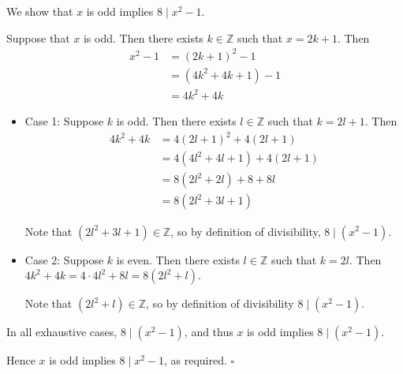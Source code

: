 We show that $x$ is odd implies $8 \mid x^{2} - 1$.

Suppose that $x$ is odd.
Then there exists $k \in \mathbb{Z}$ such that $x = 2k + 1$.
Then
\begin{align*}
  x^{2} - 1 &= (2k + 1)^{2} - 1 \\
  &= (4k^{2} + 4k + 1) - 1 \\
  &= 4k^{2} + 4k
\end{align*}

\begin{itemize}
  \item Case 1: Suppose $k$ is odd.
    Then there exists $l \in \mathbb{Z}$ such that $k = 2l + 1$.
    Then
    \begin{align*}
      4k^{2} + 4k &= 4(2l + 1)^{2} + 4(2l + 1) \\
      &= 4(4l^{2} + 4l + 1) + 4(2l + 1) \\
      &= 8(2l^{2} + 2l) + 8 + 8l \\
      &= 8(2l^{2} + 3l + 1)
    \end{align*}

    Note that $(2l^{2} + 3l + 1) \in \mathbb{Z}$, so by definition of divisibility, $8 \mid (x^{2} - 1)$.
  \item Case 2: Suppose $k$ is even.
    Then there exists $l \in \mathbb{Z}$ such that $k = 2l$.
    Then $4k^{2} + 4k = 4 \cdot 4l^{2} + 8l = 8(2l^{2} + l)$.

    Note that $(2l^{2} + l) \in \mathbb{Z}$, so by definition of divisibility $8 \mid (x^{2} - 1)$.
\end{itemize}

In all exhaustive cases, $8 \mid (x^{2} - 1)$, and thus $x$ is odd implies $8 \mid (x^{2} - 1)$.

Hence $x$ is odd implies $8 \mid x^{2} - 1$, as required. \hfill$\square$